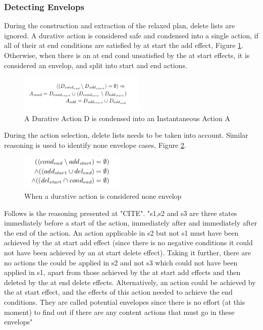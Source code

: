\documentclass
[a4paper
,english
,parskip=half
,bibliography=totoc
]{scrreprt}
\begin{document}
        \subsubsection{Detecting Envelops}
        During the construction and extraction of the relaxed plan, delete lists are ignored. A durative action is considered safe and condensed into a single action, if all of their at end conditions are satisfied by at start the add effect, Figure \ref{fig:none_env_rpg}. Otherwise, when there is an at end cond unsatisfied by the at start effects, it is considered an envelop, and split into start and end actions.
         \begin{figure}[h]
            \centering    
            \includegraphics[width=6cm]{env_RPG.png}
            \caption{A Durative Action D is condensed into an Instantaneous Action A}
             \label{fig:none_env_rpg}
        \end{figure}


        During the action selection, delete lists needs to be taken into account. Similar reasoning is used to identify none envelope cases, Figure \ref{fig:none_env_selection}.
          \begin{figure}[h]
            \centering    
            \includegraphics[width=5cm]{env_selection.png}
            \caption{When a durative action is considered none envelop}
             \label{fig:none_env_selection}
        \end{figure}

         Follows is the reasoning presented at "CITE". "s1,s2 and s3 are three states immediately before a start of the action, immediately after and immediately after the end of the action. An action applicable in s2 but not s1 must have been achieved by the at start add effect (since there is no negative conditions it could not have been achieved by an at start delete effect). Taking it further, there are no actions the could be applied in s2 and not s3 which could not have been applied in s1, apart from those achieved by the at start add effects and then deleted by the at end delete effects. Alternatively, an action could be achieved by the at start effect, and the effects of this action needed to achieve the end conditions. They are called potential envelopes since there is no effort (at this moment) to find out if there are any content actions that must go in these envelops"
\end{document}
